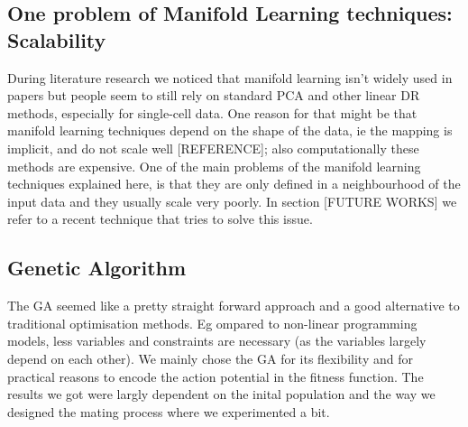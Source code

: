 \documentclass[journal, a4paper]{IEEEtran}
\newcommand{\var}[1]{{\ttfamily#1}}%
\begin{document}
\subsection{One problem of Manifold Learning techniques: Scalability}
During literature research we noticed that manifold learning isn’t widely used in papers but people seem to still rely on standard PCA and other linear DR methods, especially for single-cell data.
One reason for that might be that manifold learning techniques depend on the shape of the data, ie the mapping is implicit, and do not scale well [REFERENCE]; also computationally these methods are expensive. 
One of the main problems of the manifold learning techniques explained here, is that they are only defined in a neighbourhood of the input data and they usually scale very poorly. In section [FUTURE WORKS] we refer to a recent technique that tries to solve this issue.


\subsection{Genetic Algorithm}
The GA seemed like a pretty straight forward approach and a good alternative to traditional optimisation methods.
Eg ompared to non-linear programming models, less variables and constraints are necessary (as the variables largely depend on each other). We mainly chose the GA for its flexibility and for practical reasons to encode the action potential in the fitness function. The results we got were largly dependent on the inital population and the way we designed the mating process where we experimented a bit. 

%
%
\end{document}
